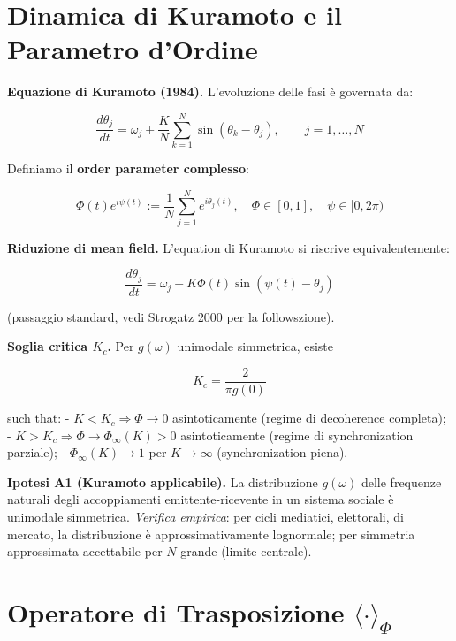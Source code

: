 \section{Dinamica di Kuramoto e il Parametro
d'Ordine}\label{dinamica-di-kuramoto-e-il-parameter-dordine}

\Proved{} \textbf{Equazione di Kuramoto (1984).} L'evoluzione delle fasi
è governata da:

\[
\frac{d\theta_j}{dt} = \omega_j + \frac{K}{N} \sum_{k=1}^{N} \sin(\theta_k - \theta_j), \qquad j = 1, \ldots, N
\]

Definiamo il \textbf{order parameter complesso}:

\[
\Phi(t) e^{i\psi(t)} := \frac{1}{N} \sum_{j=1}^{N} e^{i\theta_j(t)}, \quad \Phi \in [0, 1], \quad \psi \in [0, 2\pi)
\]

\Proved{} \textbf{Riduzione di mean field.} L'equation di Kuramoto si
riscrive equivalentemente:

\[
\frac{d\theta_j}{dt} = \omega_j + K \Phi(t) \sin(\psi(t) - \theta_j)
\]

(passaggio standard, vedi Strogatz 2000 per la followszione).

\Proved{} \textbf{Soglia critica \(K_c\).} Per \(g(\omega)\) unimodale
simmetrica, esiste

\[
K_c = \frac{2}{\pi g(0)}
\]

such that: - \(K < K_c \Rightarrow \Phi \to 0\) asintoticamente (regime
di decoherence completa); -
\(K > K_c \Rightarrow \Phi \to \Phi_\infty(K) > 0\) asintoticamente
(regime di synchronization parziale); - \(\Phi_\infty(K) \to 1\) per
\(K \to \infty\) (synchronization piena).

\Hypoth{} \textbf{Ipotesi A1 (Kuramoto applicabile).} La distribuzione
\(g(\omega)\) delle frequenze naturali degli accoppiamenti
emittente-ricevente in un sistema sociale è unimodale simmetrica.
\emph{Verifica empirica}: per cicli mediatici, elettorali, di mercato,
la distribuzione è approssimativamente lognormale; per simmetria
approssimata accettabile per \(N\) grande (limite centrale).



\section{\texorpdfstring{Operatore di Trasposizione
\(\langle \cdot \rangle_\Phi\)}{Operatore di Trasposizione \textbackslash langle \textbackslash cdot \textbackslash rangle\_\textbackslash Phi}}\label{operator-di-trasposizione-langle-cdot-rangle_phi}

